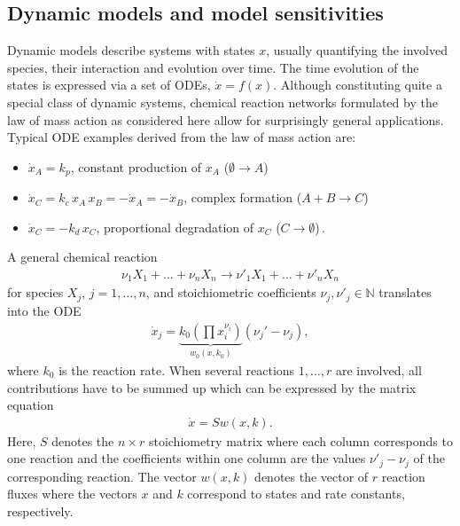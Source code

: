 \documentclass[article]{jss}
\begin{document}
\subsection{Dynamic models and model sensitivities}
Dynamic models describe systems with states $x$, usually quantifying the involved species, their interaction and evolution over time. %
The time evolution of the states is expressed via a set of ODEs, $\dot x = f(x)$. Although constituting quite a special class of dynamic systems, chemical reaction networks formulated by the law of mass action as considered here allow for surprisingly general applications. Typical ODE examples derived from the law of mass action are:
\begin{itemize}
	\item $\dot x_A = k_p$, constant production of $x_A$ ($\emptyset \rightarrow A$)
	\item $\dot x_C = k_c \,x_A \,x_B = - \dot x_A = - \dot x_B$, complex formation ($A+B \rightarrow C$)
	\item $\dot x_C = - k_d \,x_C$, proportional degradation of $x_C$ ($C \rightarrow \emptyset$)\,.
\end{itemize}
A general chemical reaction 
\begin{align}
	\nu_1 X_1 + \dots + \nu_n X_n \longrightarrow \nu'_1 X_1 + \dots + \nu'_n X_n
	\label{eq:ma_chemical}
\end{align}
for species $X_j$, $j = 1, \dots, n$, and stoichiometric coefficients $\nu_j, \nu'_j\in\mathbb N$ translates into the ODE
\begin{align}
	\dot x_j = \underbrace{k_0 \left(\prod x_i^{\nu_i}\right)}_{w_0(x, k_0)} (\nu_j' - \nu_j),
	\label{eq:ma}
\end{align}
where $k_0$ is the reaction rate.  When several reactions $1, \dots, r$ are involved, all contributions have to be summed up which can be expressed by the matrix equation
\begin{align}
	\dot x = S w(x, k).
	\label{eq:Sv}
\end{align}
Here, $S$ denotes the $n\times r$ stoichiometry matrix where each column corresponds to one reaction and the coefficients within one column are the values $\nu'_j - \nu_j$ of the corresponding reaction. The vector $w(x, k)$ denotes the vector of $r$ reaction fluxes where the vectors $x$ and $k$ correspond to states and rate constants, respectively.
\end{document}
